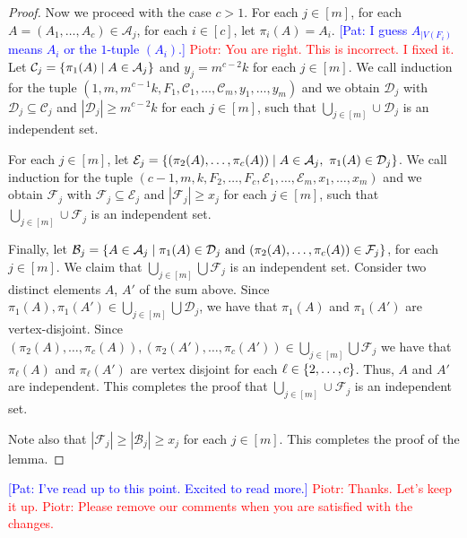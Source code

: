 \documentclass{patmorin}
\newcommand{\pat}[1]{\textcolor{Blue}{[Pat: #1]}}
\newcommand{\piotr}[1]{\textcolor{red}{Piotr: #1}}
\DeclarePairedDelimiter\set{\{}{\}}
\begin{document}
\begin{proof}
Now we proceed with the case $c>1$. 
For each $j\in[m]$, 
for each $A=(A_1,\ldots,A_c)\in \mathcal{A}_j$, 
for each $i\in[c]$, 
let $\pi_i(A)=A_i$. %
\pat{I guess $A_{\mid V(F_i)}$ means $A_i$ or the $1$-tuple $(A_i)$.} 
\piotr{You are right. This is incorrect. I fixed it.}
Let $\mathcal{C}_j=\set{\pi_1(A)\mid A\in\mathcal{A}_j}$ and
$y_j=m^{c-2}k$ for each $j\in[m]$. 
We call induction for the tuple 
$(1,m,m^{c-1}k,F_1,\mathcal{C}_1,\ldots,\mathcal{C}_m,y_1,\ldots,y_m)$ and 
we obtain $\mathcal{D}_j$ with 
$\mathcal{D}_j\subseteq \mathcal{C}_j$ and $|\mathcal{D}_j|\geq m^{c-2}k$ for each $j\in [m]$, 
such that $\bigcup_{j\in[m]}\cup\mathcal{D}_j$ is an independent set.

For each $j\in[m]$, let $\mathcal{E}_j=\set{(\pi_2(A),\ldots,\pi_c(A))\mid A\in\mathcal{A}_j,\ \pi_1(A)\in \mathcal{D}_j}$. 
We call induction for the tuple 
$(c-1,m,k,F_2,\ldots,F_{c},\mathcal{E}_1,\ldots,\mathcal{E}_m,x_1,\ldots,x_m)$ and 
we obtain $\mathcal{F}_j$ with 
$\mathcal{F}_j\subseteq \mathcal{E}_j$ and $|\mathcal{F}_j|\geq x_j$ for each $j\in [m]$, 
such that $\bigcup_{j\in[m]}\cup\mathcal{F}_j$ is an independent set.

Finally, let $\mathcal{B}_j=\set{A\in\mathcal{A}_j\mid \pi_1(A)\in \mathcal{D}_j \textrm{ and } (\pi_2(A),\ldots,\pi_c(A))\in\mathcal{F}_j}$, for each $j\in[m]$. 
We claim that $\bigcup_{j\in[m]}\bigcup 
\mathcal{F}_j$ is an independent set. 
Consider two distinct elements $A$, $A'$ of the sum above. 
Since $\pi_1(A), \pi_1(A')\in\bigcup_{j\in[m]}\bigcup 
\mathcal{D}_j$, we have that $\pi_1(A)$ and $\pi_1(A')$ are vertex-disjoint. 
Since $(\pi_2(A),\ldots,\pi_c(A)), (\pi_2(A'),\ldots,\pi_c(A'))\in\bigcup_{j\in[m]}\bigcup 
\mathcal{F}_j$ we have that $\pi_\ell(A)$ and $\pi_{\ell}(A')$ are vertex disjoint for each $\ell\in\set{2,\ldots,c}$.
Thus, $A$ and $A'$ are independent. 
This completes the proof that $\bigcup_{j\in[m]}\cup 
\mathcal{F}_j$ is an independent set. 

Note also that $|\mathcal{F}_j|\geq |\mathcal{B}_j|\geq x_j$ for each $j\in[m]$. 
This completes the proof of the lemma.
\end{proof}

\noindent\pat{I've read up to this point.  Excited to read more.}
\piotr{Thanks. Let's keep it up.}
\piotr{Please remove our comments when you are satisfied with the changes.}
\end{document}
